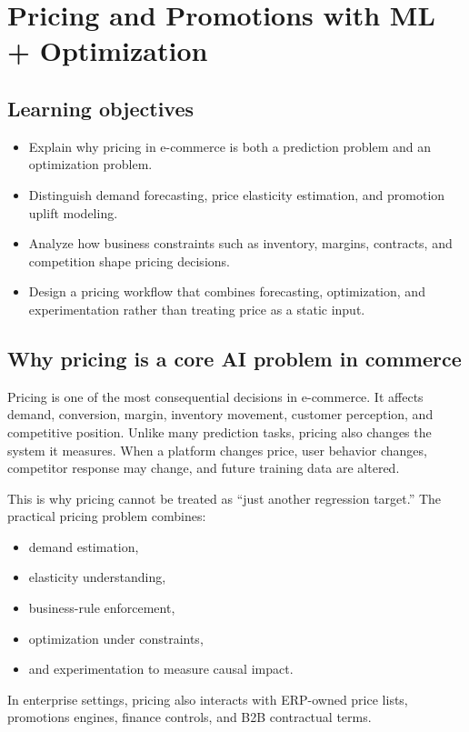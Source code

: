 \chapter{Pricing and Promotions with ML + Optimization}

\section{Learning objectives}
\begin{itemize}
  \item Explain why pricing in e-commerce is both a prediction problem and an optimization problem.
  \item Distinguish demand forecasting, price elasticity estimation, and promotion uplift modeling.
  \item Analyze how business constraints such as inventory, margins, contracts, and competition shape pricing decisions.
  \item Design a pricing workflow that combines forecasting, optimization, and experimentation rather than treating price as a static input.
\end{itemize}

\section{Why pricing is a core AI problem in commerce}
Pricing is one of the most consequential decisions in e-commerce.
It affects demand, conversion, margin, inventory movement, customer perception, and competitive position.
Unlike many prediction tasks, pricing also changes the system it measures.
When a platform changes price, user behavior changes, competitor response may change, and future training data are altered.

This is why pricing cannot be treated as ``just another regression target.''
The practical pricing problem combines:
\begin{itemize}
  \item demand estimation,
  \item elasticity understanding,
  \item business-rule enforcement,
  \item optimization under constraints,
  \item and experimentation to measure causal impact.
\end{itemize}

In enterprise settings, pricing also interacts with ERP-owned price lists, promotions engines, finance controls, and B2B contractual terms.

